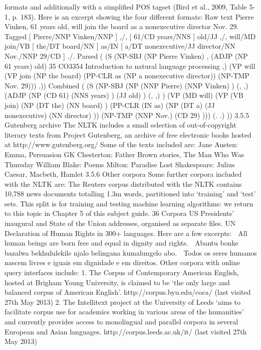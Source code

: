 formats and additionally with a simplified POS tagset (Bird et al., 2009, Table 5-1,
p. 183). Here is an excerpt showing the four different formats:
Raw text
Pierre Vinken, 61 years old, will join the board as a
nonexecutive director Nov. 29.
Tagged
[ Pierre/NNP Vinken/NNP ]
,/,
[ 61/CD years/NNS ]
old/JJ ,/, will/MD join/VB
[ the/DT board/NN ]
as/IN
[ a/DT nonexecutive/JJ director/NN Nov./NNP 29/CD ]
./.
Parsed
( (S (NP-SBJ (NP Pierre Vinken)
,
(ADJP (NP 61 years) old)
35
CO3354 Introduction to natural language processing
,)
(VP will
(VP join
(NP the board)
(PP-CLR as
(NP a nonexecutive director))
(NP-TMP Nov. 29)))
.))
Combined
( (S
(NP-SBJ
(NP (NNP Pierre) (NNP Vinken) )
(, ,)
(ADJP
(NP (CD 61) (NNS years) )
(JJ old) )
(, ,) )
(VP (MD will)
(VP (VB join)
(NP (DT the) (NN board) )
(PP-CLR (IN as)
(NP (DT a) (JJ nonexecutive) (NN director) ))
(NP-TMP (NNP Nov.) (CD 29) )))
(. .) ))
3.5.5 Gutenberg archive
The NLTK includes a small selection of out-of-copyright literary texts from Project
Gutenberg, an archive of free electronic books hosted at http://www.gutenberg.org/
Some of the texts included are:
Jane Austen: Emma, Persuasion
GK Chesterton: Father Brown stories, The Man Who Was Thursday
William Blake: Poems
Milton: Paradise Lost
Shakespeare: Julius Caesar, Macbeth, Hamlet
3.5.6 Other corpora
Some further corpora included with the NLTK are:
The Reuters corpus distributed with the NLTK contains 10,788 news documents
totalling 1.3m words, partitioned into ‘training’ and ‘test’ sets. This split is for
training and testing machine learning algorithms: we return to this topic in
Chapter 5 of this subject guide.
36
Corpora
US Presidents’ inaugural and State of the Union addresses, organised as separate
files.
UN Declaration of Human Rights in 300+ languages. Here are a few excerpts:
 All human beings are born free and equal in dignity and rights.
 Abantu bonke bazalwa bekhululekile njalo belingana kumalungelo abo.
 Todos os seres humanos nascem livres e iguais em dignidade e em direitos.
Other corpora with online query interfaces include:
1. The Corpus of Contemporary American English, hosted at Brigham Young
University, is claimed to be ‘the only large and balanced corpus of American
English’. http://corpus.byu.edu/coca/ (last visited 27th May 2013)
2. The Intellitext project at the University of Leeds ‘aims to facilitate corpus use for
academics working in various areas of the humanities’ and currently provides
access to monolingual and parallel corpora in several European and Asian
languages. http://corpus.leeds.ac.uk/it/ (last visited 27th May 2013)
